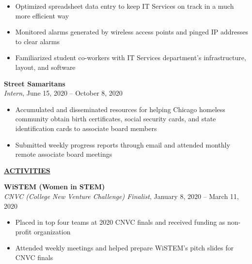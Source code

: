 \documentclass[
]{article}
\providecommand{\tightlist}{%
  \setlength{\itemsep}{0pt}\setlength{\parskip}{0pt}}
\begin{document}
\begin{itemize}
\tightlist
\item
  Optimized spreadsheet data entry to keep IT Services on track in a
  much more efficient way
\end{itemize}

\begin{itemize}
\item
  Monitored alarms generated by wireless access points and pinged IP
  addresses to clear alarms
\item
  Familiarized student co-workers with IT Services department's
  infrastructure, layout, and software
\end{itemize}

\textbf{Street Samaritans}\\
\emph{Intern}, June 15, 2020 -- October 8, 2020

\begin{itemize}
\item
  Accumulated and disseminated resources for helping Chicago homeless
  community obtain birth certificates, social security cards, and state
  identification cards to associate board members
\item
  Submitted weekly progress reports through email and attended monthly
  remote associate board meetings
\end{itemize}

\textbf{\underline{ACTIVITIES}}

\textbf{WiSTEM (Women in STEM)}\\
\emph{CNVC (College New Venture Challenge) Finalist}, January 8, 2020 --
March 11, 2020

\begin{itemize}
\tightlist
\item
  Placed in top four teams at 2020 CNVC finals and received funding as
  non-profit organization
\end{itemize}

\begin{itemize}
\tightlist
\item
  Attended weekly meetings and helped prepare WiSTEM's pitch slides for
  CNVC finals
\end{itemize}


\end{document}

